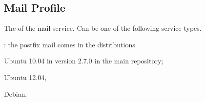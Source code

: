 \label{sec:mail_profile}
\subsection{Mail Profile}


The  of the mail service. Can be one of the following 
service types.
\begin{asparaitem}
%
\item[\qcode{postfix}:] 
the postfix mail comes in the distributions 
\begin{compactitem}
\item[\TheDistribution{ubuntu}] Ubuntu 10.04 in version 2.7.0 in the main repository;
\item[\TheDistribution{ubuntu}] Ubuntu 12.04,
\item[\TheDistribution{debian}] Debian,
\end{compactitem}
%
\end{asparaitem}

